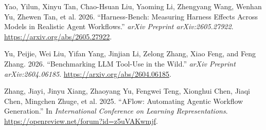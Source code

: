 \documentclass[
  10pt,
]{article}
\newlength{\cslhangindent}
\newenvironment{CSLReferences}[2] %
 {\begin{list}{}{%
  \setlength{\itemindent}{0pt}
  \setlength{\leftmargin}{0pt}
  \setlength{\parsep}{0pt}
  \ifodd #1
   \setlength{\leftmargin}{\cslhangindent}
   \setlength{\itemindent}{-1\cslhangindent}
  \fi
  \setlength{\itemsep}{#2\baselineskip}}}
 {\end{list}}
\begin{document}
\begin{CSLReferences}{1}{0}
Yao, Yilun, Xinyu Tan, Chao-Hsuan Liu, Yaoming Li, Zhengyang Wang,
Wenhan Yu, Zhewen Tan, et al. 2026. {``Harness-Bench: Measuring Harness
Effects Across Models in Realistic Agent Workflows.''} \emph{arXiv
Preprint arXiv:2605.27922}. \url{https://arxiv.org/abs/2605.27922}.

Yu, Peijie, Wei Liu, Yifan Yang, Jinjian Li, Zelong Zhang, Xiao Feng,
and Feng Zhang. 2026. {``Benchmarking LLM Tool-Use in the Wild.''}
\emph{arXiv Preprint arXiv:2604.06185}.
\url{https://arxiv.org/abs/2604.06185}.

Zhang, Jiayi, Jinyu Xiang, Zhaoyang Yu, Fengwei Teng, Xionghui Chen,
Jiaqi Chen, Mingchen Zhuge, et al. 2025. {``AFlow: Automating Agentic
Workflow Generation.''} In \emph{International Conference on Learning
Representations}. \url{https://openreview.net/forum?id=z5uVAKwmjf}.

\end{CSLReferences}
\end{document}
